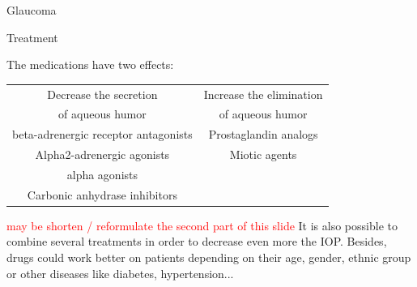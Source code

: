 \begin{frame}{Glaucoma}
{\begin{center}
\end{center}}
\end{frame}

\begin{frame}[shrink=5]{Treatment}

The medications have two effects:
\newline
\\
\begin{tabular}{|c|c|}
\hline
Decrease the secretion & Increase the elimination \\
of aqueous humor &  of aqueous humor\\
\hline
beta-adrenergic receptor antagonists & Prostaglandin analogs \\
Alpha2-adrenergic agonists & Miotic agents \\
alpha agonists &  \\
Carbonic anhydrase inhibitors &  \\
\hline
\end{tabular}
\newline
\newline

\textcolor{red}{may be shorten / reformulate the second part of this slide}
It is also possible to combine several treatments in order to decrease even more the IOP.
Besides, drugs could work better on patients depending on their age, gender, ethnic group or other diseases like diabetes, hypertension...

\end{frame}

